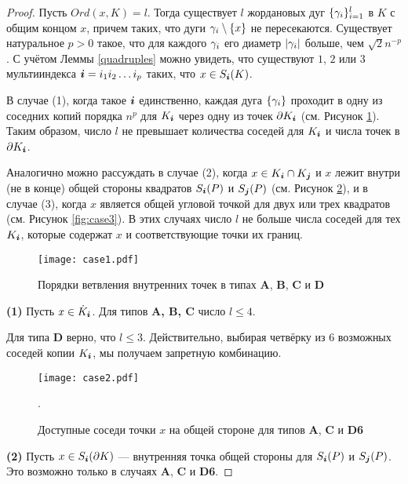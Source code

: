 \begin{proof}\label{proof:point_branching}
Пусть $Ord(x,K)=l$.
Тогда существует $l$ жордановых дуг $\{\gamma_i\}_{i=1}^l$ в $K$ с общим концом $x$, причем таких, что дуги $\gamma_i\setminus \{x\}$ не пересекаются.
Существует натуральное $p>0$ такое, что для каждого $\gamma_i$ его диаметр $|\gamma_i|$ больше, чем $\sqrt{2}n^{-p}$.
С учётом Леммы \ref{quadruples} можно увидеть, что существуют $1$, $2$ или $3$ мультииндекса ${\bm{i}}=i_1i_2\ldots i_p$ таких, что $x\in S_{\bm{i}}(K)$.

В случае (1), когда такое ${\bm{i}}$ единственно, каждая дуга $\{\gamma_i\}$ проходит в одну из соседних копий порядка $n^p$ для $K_{\bm{i}}$ через одну из точек $\partial K_{\bm{i}}$ (см. Рисунок \ref{fig:case1}). 
Таким образом, число $l$ не превышает количества соседей для $K_{\bm{i}}$  и числа точек в $\partial K_{\bm{i}}$. 

Аналогично можно рассуждать в случае (2), когда $x\in K_{\bm{i}}\cap K_{\bm{j}}$ и $x$ лежит внутри (не в конце) общей стороны квадратов $S_{\bm{i}}(P)$ и $S_{\bm{j}}(P)$ (см. Рисунок \ref{fig:case2}), и в случае (3), когда $x$ является общей угловой точкой для двух или трех квадратов (см. Рисунок \ref{fig:case3}). 
В этих случаях число $l$ не больше числа соседей для тех $K_{\bm{i}}$, которые содержат $x$ и соответствующие точки их границ.

\begin{figure}[H]
    \centering
    \texttt{[image: case1.pdf]}
    \caption{Порядки ветвления внутренних точек в типах \textbf{A}, \textbf{B}, \textbf{C} и \textbf{D}}
    \label{fig:case1}
\end{figure}

\textbf{(1)}
Пусть $x\in \dot K_{\bm{i}}$.
Для типов {\bf A, B, C} число $l\leq 4$.

Для типа {\bf D} верно, что $l\le 3$. 
Действительно, выбирая четвёрку из $6$ возможных соседей копии $K_{\bm{i}}$, мы получаем запретную комбинацию. 

\begin{figure}[h]
    \centering
    \texttt{[image: case2.pdf]}
    \caption{Доступные соседи точки $x$ на общей стороне для типов \textbf{A}, \textbf{C} и \textbf{D6}}. 
    \label{fig:case2}
\end{figure}

\textbf{(2)}
Пусть $x\in S_{\bm{i}}(\partial K)$ --- внутренняя точка общей стороны для $S_{\bm{i}}(P)$ и $S_{\bm{j}}(P)$.
Это возможно только в случаях \textbf{A}, \textbf{C} и \textbf{D6}.


\end{proof}
